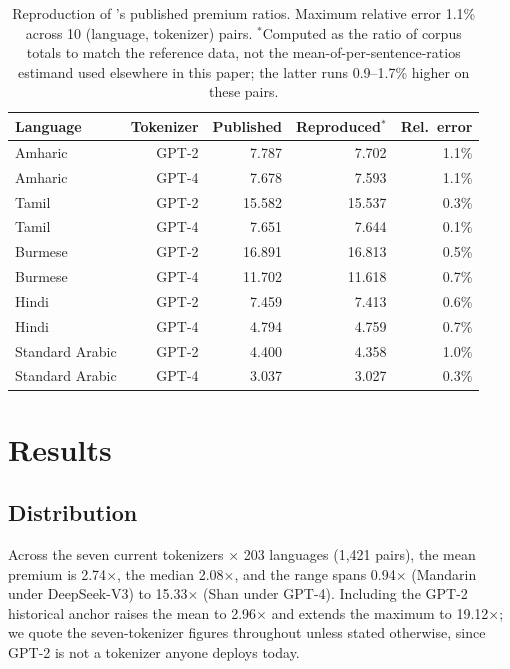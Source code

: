 \documentclass[11pt]{article}
\begin{document}
\begin{table}[htbp]
\centering
\small
\begin{tabular}{lrrrr}
\toprule
Language & Tokenizer & Published & Reproduced$^\ast$ & Rel.\ error \\
\midrule
Amharic         & GPT-2 & 7.787  & 7.702  & 1.1\% \\
Amharic         & GPT-4 & 7.678  & 7.593  & 1.1\% \\
Tamil           & GPT-2 & 15.582 & 15.537 & 0.3\% \\
Tamil           & GPT-4 & 7.651  & 7.644  & 0.1\% \\
Burmese         & GPT-2 & 16.891 & 16.813 & 0.5\% \\
Burmese         & GPT-4 & 11.702 & 11.618 & 0.7\% \\
Hindi           & GPT-2 & 7.459  & 7.413  & 0.6\% \\
Hindi           & GPT-4 & 4.794  & 4.759  & 0.7\% \\
Standard Arabic & GPT-2 & 4.400  & 4.358  & 1.0\% \\
Standard Arabic & GPT-4 & 3.037  & 3.027  & 0.3\% \\
\bottomrule
\end{tabular}
\caption{Reproduction of \citet{petrov2023}'s published premium ratios.
Maximum relative error 1.1\% across 10 (language, tokenizer) pairs.
$^\ast$Computed as the ratio of corpus totals to match the reference data,
not the mean-of-per-sentence-ratios estimand used elsewhere in this paper;
the latter runs 0.9--1.7\% higher on these pairs.}
\label{tab:validation}
\end{table}

\section{Results}

\subsection{Distribution}

Across the seven current tokenizers $\times$ 203 languages (1{,}421 pairs),
the mean premium is 2.74$\times$, the median 2.08$\times$, and the range
spans 0.94$\times$ (Mandarin under DeepSeek-V3) to 15.33$\times$ (Shan under
GPT-4). Including the GPT-2 historical anchor raises the mean to
2.96$\times$ and extends the maximum to 19.12$\times$; we quote the
seven-tokenizer figures throughout unless stated otherwise, since GPT-2 is
not a tokenizer anyone deploys today.
\end{document}
